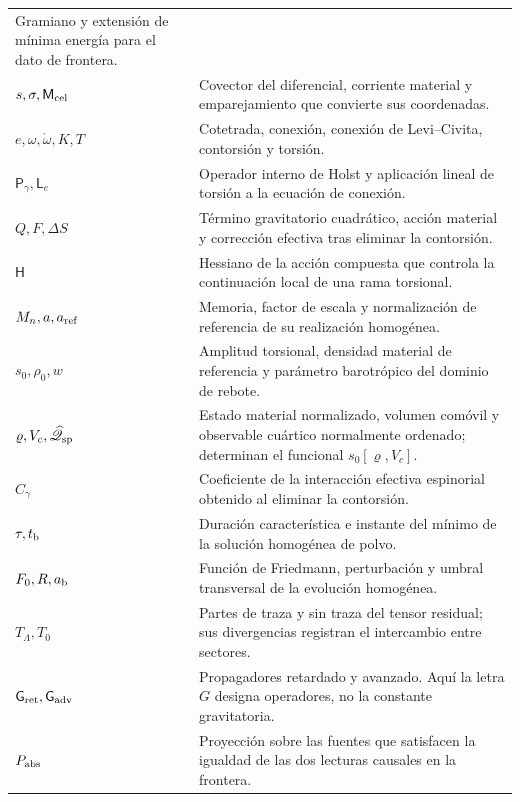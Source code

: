\begin{longtable}{@{}p{.23\linewidth}p{.72\linewidth}@{}}
Gramiano y extensión de mínima energía para el dato de frontera.\\
\(s,\sigma,\mathsf M_{\rm cel}\) & Covector del diferencial, corriente
material y emparejamiento que convierte sus coordenadas.\\
\(e,\omega,\mathring\omega,K,T\) & Cotetrada, conexión, conexión de
Levi--Civita, contorsión y torsión.\\
\(\mathsf P_\gamma,\mathsf L_e\) & Operador interno de Holst y
aplicación lineal de torsión a la ecuación de conexión.\\
\(Q,F,\Delta S\) & Término gravitatorio cuadrático, acción material
y corrección efectiva tras eliminar la contorsión.\\
\(\mathsf H\) & Hessiano de la acción compuesta que controla la
continuación local de una rama torsional.\\
\(M_n,a,a_{\rm ref}\) & Memoria, factor de escala y normalización
de referencia de su realización homogénea.\\
\(s_0,\rho_0,w\) & Amplitud torsional, densidad material de
referencia y parámetro barotrópico del dominio de rebote.\\
\(\varrho,V_c,\widehat{\mathscr Q}_{\rm sp}\) & Estado material normalizado, volumen
comóvil y observable cuártico normalmente ordenado; determinan
el funcional \(s_0[\varrho,V_c]\).\\
\(C_\gamma\) & Coeficiente de la interacción efectiva espinorial
obtenido al eliminar la contorsión.\\
\(\tau,t_{\rm b}\) & Duración característica e instante del mínimo
de la solución homogénea de polvo.\\
\(F_0,R,a_{\rm b}\) & Función de Friedmann, perturbación y
umbral transversal de la evolución homogénea.\\
\(T_\Lambda,T_0\) & Partes de traza y sin traza del tensor residual;
sus divergencias registran el intercambio entre sectores.\\
\(\mathsf{G}_{\rm ret},\mathsf{G}_{\rm adv}\) & Propagadores retardado y avanzado.
Aquí la letra \(G\) designa operadores, no la constante gravitatoria.\\
\(P_{\rm abs}\) & Proyección sobre las fuentes que satisfacen la
igualdad de las dos lecturas causales en la frontera.\\
\bottomrule
\end{longtable}

\par\endgroup
